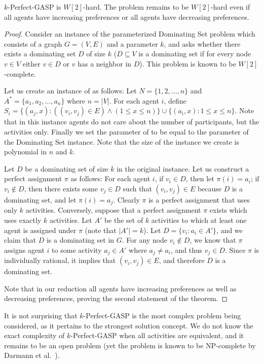 \begin{theorem} \label{GASP:thm:perfect_gasp_w2_hard}
	$k$-Perfect-GASP is $W[2]$-hard. The problem remains to be $W[2]$-hard even if all agents have increasing preferences or all agents have decreasing preferences. 
\end{theorem}
\begin{proof}
	Consider an instance of the parameterized Dominating Set problem which consists of a graph $G = (V, E)$ and a parameter $k$, and asks whether there exists a dominating set $D$ of size $k$ ($D \subseteq V$ is a dominating set if for every node $v\in V$ either $v \in D$ or $v$ has a neighbor in $D$). This problem is known to be $W[2]$-complete. 
	
	Let us create an instance of \GASPs as follows: Let $N = \{1, 2, \dots, n\}$ and $A^* = \{a_1, a_2, \dots, a_n\}$ where $n = |V|$. For each agent $i$, define $S_i = \{(a_j, x) : ((v_i, v_j) \in E) \land (1 \leq x \leq n) \} \cup \{(a_i, x) : 1 \leq x \leq n\}$. Note that in this instance agents do not care about the number of participants, but the activities only. Finally we set the parameter of \GASPs to be equal to the parameter of the Dominating Set instance. Note that the size of the \GASPs instance we create is polynomial in $n$ and $k$. 

	Let $D$ be a dominating set of size $k$ in the original instance. 
	Let us construct a perfect assignment $\pi$ as follows: 
	For each agent $i$, if $v_i \in D$, then let $\pi(i) = a_i$; if $v_i \not\in D$, then there exists some $v_j \in D$ such that $(v_i, v_j) \in E$ because $D$ is a dominating set, and let $\pi(i) = a_j$. Clearly $\pi$ is a perfect assignment that uses only $k$ activities.
	Conversely, suppose that a perfect assignment $\pi$ exists which uses exactly $k$ activities. Let $A'$ be the set of $k$ activities to which at least one agent is assigned under $\pi$ (note that $|A'| = k$). Let $D = \{v_i : a_i \in A'\}$, and we claim that $D$ is a dominating set in $G$. For any node $v_i \not\in D$, we know that $\pi$ assigns agent $i$ to some activity $a_j \in A'$ where $a_j \neq a_i$, and thus $v_j \in D$. Since $\pi$ is individually rational, it implies that $(v_i, v_j)\in E$, and therefore $D$ is a dominating set. 
	
	Note that in our reduction all agents have increasing preferences as well as decreasing preferences, proving the second statement of the theorem. 
\end{proof}

It is not surprising that $k$-Perfect-GASP is the most complex problem being considered, as it pertains to the strongest solution concept. We do not know the exact complexity of $k$-Perfect-GASP when all activities are equivalent, and it remains to be an open problem (yet the problem is known to be NP-complete by Darmann et al.~\cite{GASP12WINE}).



